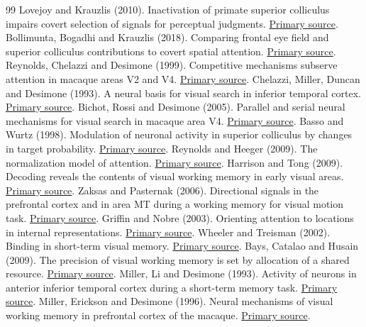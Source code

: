 \begin{thebibliography}{99}
 Lovejoy and Krauzlis (2010). Inactivation of primate superior colliculus impairs covert selection of signals for perceptual judgments. \href{https://pubmed.ncbi.nlm.nih.gov/20023651/}{Primary source}.
 Bollimunta, Bogadhi and Krauzlis (2018). Comparing frontal eye field and superior colliculus contributions to covert spatial attention. \href{https://pmc.ncbi.nlm.nih.gov/articles/PMC6120922/}{Primary source}.
 Reynolds, Chelazzi and Desimone (1999). Competitive mechanisms subserve attention in macaque areas V2 and V4. \href{https://pubmed.ncbi.nlm.nih.gov/10024360/}{Primary source}.
 Chelazzi, Miller, Duncan and Desimone (1993). A neural basis for visual search in inferior temporal cortex. \href{https://pubmed.ncbi.nlm.nih.gov/8497317/}{Primary source}.
 Bichot, Rossi and Desimone (2005). Parallel and serial neural mechanisms for visual search in macaque area V4. \href{https://doi.org/10.1126/science.1109676}{Primary source}.
 Basso and Wurtz (1998). Modulation of neuronal activity in superior colliculus by changes in target probability. \href{https://pubmed.ncbi.nlm.nih.gov/9736670/}{Primary source}.
 Reynolds and Heeger (2009). The normalization model of attention. \href{https://pmc.ncbi.nlm.nih.gov/articles/PMC2752446/}{Primary source}.
 Harrison and Tong (2009). Decoding reveals the contents of visual working memory in early visual areas. \href{https://pubmed.ncbi.nlm.nih.gov/19225460/}{Primary source}.
 Zaksas and Pasternak (2006). Directional signals in the prefrontal cortex and in area MT during a working memory for visual motion task. \href{https://pubmed.ncbi.nlm.nih.gov/17093094/}{Primary source}.
 Griffin and Nobre (2003). Orienting attention to locations in internal representations. \href{https://pubmed.ncbi.nlm.nih.gov/14709235/}{Primary source}.
 Wheeler and Treisman (2002). Binding in short-term visual memory. \href{https://pubmed.ncbi.nlm.nih.gov/11900102/}{Primary source}.
 Bays, Catalao and Husain (2009). The precision of visual working memory is set by allocation of a shared resource. \href{https://pubmed.ncbi.nlm.nih.gov/19810788/}{Primary source}.
 Miller, Li and Desimone (1993). Activity of neurons in anterior inferior temporal cortex during a short-term memory task. \href{https://pubmed.ncbi.nlm.nih.gov/8463829/}{Primary source}.
 Miller, Erickson and Desimone (1996). Neural mechanisms of visual working memory in prefrontal cortex of the macaque. \href{https://pmc.ncbi.nlm.nih.gov/articles/PMC6579322/}{Primary source}.

\end{thebibliography}
